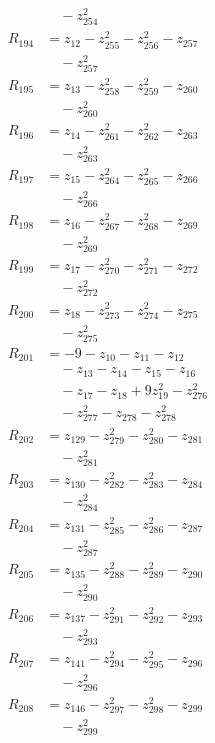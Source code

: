\begin{align*}
&\quad -z_{254}^{2} \\
R_{194} &= z_{12} -z_{255}^{2} -z_{256}^{2} -z_{257} \\
&\quad -z_{257}^{2} \\
R_{195} &= z_{13} -z_{258}^{2} -z_{259}^{2} -z_{260} \\
&\quad -z_{260}^{2} \\
R_{196} &= z_{14} -z_{261}^{2} -z_{262}^{2} -z_{263} \\
&\quad -z_{263}^{2} \\
R_{197} &= z_{15} -z_{264}^{2} -z_{265}^{2} -z_{266} \\
&\quad -z_{266}^{2} \\
R_{198} &= z_{16} -z_{267}^{2} -z_{268}^{2} -z_{269} \\
&\quad -z_{269}^{2} \\
R_{199} &= z_{17} -z_{270}^{2} -z_{271}^{2} -z_{272} \\
&\quad -z_{272}^{2} \\
R_{200} &= z_{18} -z_{273}^{2} -z_{274}^{2} -z_{275} \\
&\quad -z_{275}^{2} \\
R_{201} &= -9 -z_{10} -z_{11} -z_{12} \\
&\quad -z_{13} -z_{14} -z_{15} -z_{16} \\
&\quad -z_{17} -z_{18} +9z_{19}^{2} -z_{276}^{2} \\
&\quad -z_{277}^{2} -z_{278} -z_{278}^{2} \\
R_{202} &= z_{129} -z_{279}^{2} -z_{280}^{2} -z_{281} \\
&\quad -z_{281}^{2} \\
R_{203} &= z_{130} -z_{282}^{2} -z_{283}^{2} -z_{284} \\
&\quad -z_{284}^{2} \\
R_{204} &= z_{131} -z_{285}^{2} -z_{286}^{2} -z_{287} \\
&\quad -z_{287}^{2} \\
R_{205} &= z_{135} -z_{288}^{2} -z_{289}^{2} -z_{290} \\
&\quad -z_{290}^{2} \\
R_{206} &= z_{137} -z_{291}^{2} -z_{292}^{2} -z_{293} \\
&\quad -z_{293}^{2} \\
R_{207} &= z_{141} -z_{294}^{2} -z_{295}^{2} -z_{296} \\
&\quad -z_{296}^{2} \\
R_{208} &= z_{146} -z_{297}^{2} -z_{298}^{2} -z_{299} \\
&\quad -z_{299}^{2} \\

\end{align*}
